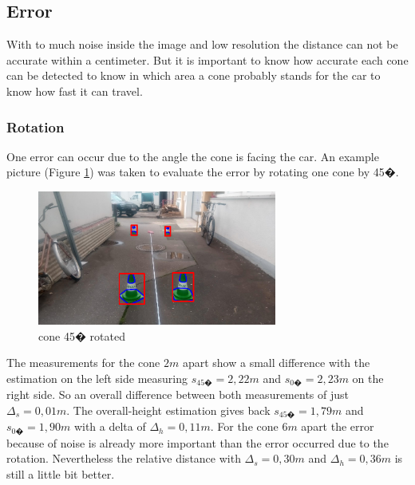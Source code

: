 \documentclass[10pt,a4paper]{article}
\begin{document}
	
	\subsection{Error}
	With to much noise inside the image and low resolution the distance can not be accurate within a centimeter. But it is important to know how accurate each cone can be detected to know in which area a cone probably stands for the car to know how fast it can travel.
	
	\subsubsection{Rotation}
	One error can occur due to the angle the cone is facing the car. An example picture (Figure \ref{cone-rotated}) was taken to evaluate the  error by rotating one cone by 45�. 
	\begin{figure}[h]
		\centering
		\includegraphics[width=0.7\textwidth]{Abb/cone-rotated.png}
		\caption{cone 45� rotated}
		\label{cone-rotated}
	\end{figure}
	The measurements for the cone $2m$ apart show a small difference with the estimation on the left side measuring $s_{45�} = 2,22m$ and $s_{0�} = 2,23m$ on the right side. So an overall difference between both measurements of just $\Delta_s = 0,01m$. The overall-height estimation gives back $s_{45�} = 1,79m$ and $s_{0�} = 1,90m$ with a delta of $\Delta_h = 0,11m$.
	For the cone $6m$ apart the error because of noise is already more important than the error occurred due to the rotation. Nevertheless the relative distance with $\Delta_s = 0,30m$ and $\Delta_h = 0,36m$ is still a little bit better.
	
	
\end{document}

